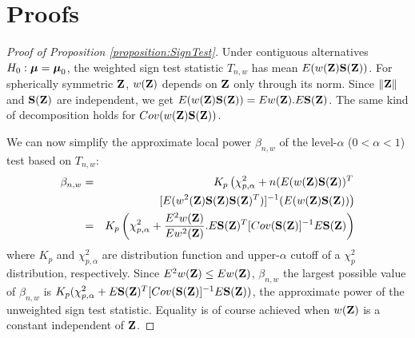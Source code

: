 
\newpage
\section{Proofs}
\label{section:appC}

\begin{proof}[Proof of Proposition \ref{proposition:SignTest}]
Under contiguous alternatives $H_0: {\boldsymbol{\mu}} = {\boldsymbol{\mu}}_0$, the weighted sign test statistic $T_{n,w}$ has mean $E (w({\mathbf{Z}}) {\mathbf{S}} ({\mathbf{Z}}))$. For spherically symmetric ${\mathbf{Z}}$, $w({\mathbf{Z}})$ depends on ${\mathbf{Z}}$ only through its norm. Since $\| {\mathbf{Z}} \|$ and ${\mathbf{S}}({\mathbf{Z}})$ are independent, we get $E (w({\mathbf{Z}}) {\mathbf{S}} ({\mathbf{Z}})) = E w({\mathbf{Z}}). E {\mathbf{S}} ({\mathbf{Z}})$. The same kind of decomposition holds for $Cov(w({\mathbf{Z}}) {\mathbf{S}}({\mathbf{Z}}))$.

We can now simplify the approximate local power $\beta_{n,w}$ of the level-$\alpha$ ($0 < \alpha < 1$) test based on $T_{n,w}$:
%
\begin{eqnarray*}
\beta_{n,w} &=& K_p \left( \chi^2_{p,\alpha} + n (E (w({\mathbf{Z}}) {\mathbf{S}} ({\mathbf{Z}}))^T \right.\\
&& \left. [ E (w^2({\mathbf{Z}}) {\mathbf{S}} ({\mathbf{Z}}) {\mathbf{S}} ({\mathbf{Z}})^T) ]^{-1} (E (w({\mathbf{Z}}) {\mathbf{S}} ({\mathbf{Z}})) \right)\\
&=& K_p \left( \chi^2_{p,\alpha} + \frac{E^2 w({\mathbf{Z}})}{Ew^2({\mathbf{Z}})}. E{\mathbf{S}}({\mathbf{Z}})^T [Cov({\mathbf{S}}({\mathbf{Z}})]^{-1} E{\mathbf{S}}({\mathbf{Z}}) \right)
\end{eqnarray*}
%
where $K_p$ and $\chi^2_{p,\alpha}$ are distribution function and upper-$\alpha$ cutoff of a $\chi^2_p$ distribution, respectively. Since $E^2 w({\mathbf{Z}}) \leq Ew({\mathbf{Z}})$, $\beta_{n,w}$ the largest possible value of $\beta_{n,w}$ is $K_p ( \chi^2_{p,\alpha} + E{\mathbf{S}}({\mathbf{Z}})^T [Cov({\mathbf{S}}({\mathbf{Z}})]^{-1} E{\mathbf{S}}({\mathbf{Z}}) )$, the approximate power of the unweighted sign test statistic. Equality is of course achieved when $w({\mathbf{Z}})$ is a constant independent of ${\mathbf{Z}}$.
\end{proof}

